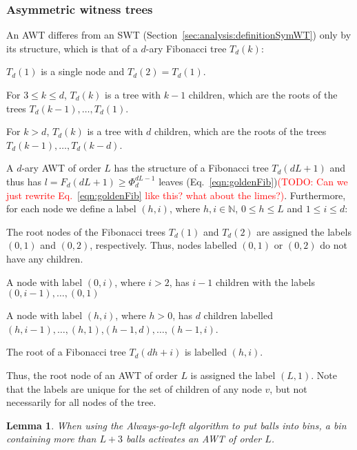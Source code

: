 \documentclass[a4paper,12pt]{article}
\newcommand\todo[1]{\textcolor{red}{(TODO: #1)}}
\newtheorem{lemma}{Lemma}
\begin{document}
\subsubsection{Asymmetric witness trees}
\label{sec:analysis:definitionAsymWT}
An AWT differes from an SWT (Section~\ref{sec:analysis:definitionSymWT}) only by its structure, which is that of a $d$-ary Fibonacci tree $T_d\left(k \right)$:

\begin{compactitem}
\item $T_d(1)$ is a single node and  $T_d(2) = T_d(1)$.
\item For $3\leq k \leq d$, $T_d(k)$ is a tree with $k-1$ children, which are the roots of the trees $T_d(k-1),\ldots,T_d(1)$.
\item For $k>d$, $T_d(k)$ is a tree with $d$ children, which are the roots of the trees $T_d(k-1),\ldots,T_d(k-d)$.
\end{compactitem}
A $d$-ary AWT of order $L$ has the structure of a Fibonacci tree $T_d(d  L+1)$ and thus has $l=F_d(d L + 1) \geq \Phi_d^{d L-1}$ leaves (Eq.~\ref{eqn:goldenFib})\todo{Can we just rewrite Eq.~\ref{eqn:goldenFib} like this? what about the limes?}. 
Furthermore, for each node we define a label $(h, i)$, where $h, i \in \mathbb{N}$, $0 \leq h \leq L$ and  $1\leq i \leq d$:
\begin{compactitem}
\item The root nodes of the Fibonacci trees $T_d(1)$ and $T_d(2)$ are assigned the labels $(0,1)$ and $(0,2)$, respectively. Thus, nodes labelled $(0,1)$ or $(0,2)$ do not have any children.
\item A node with label $(0, i)$, where $i>2$, has $i-1$ children with the labels $(0,i-1),\dots,(0,1)$
\item A node with label $(h,i)$, where $h>0$, has $d$ children labelled $(h,i-1),\dots,(h,1)$,$(h-1,d),\dots,(h-1, i)$.
\item The root of a Fibonacci tree $T_d(d h+i)$ is labelled $(h, i)$. 
\end{compactitem}
Thus, the root node of an AWT of order $L$ is assigned the label $(L, 1)$. Note that the labels are unique for the set of children of any node $v$, but not necessarily for all nodes of the tree. 
\begin{lemma}
When using the Always-go-left algorithm to put balls into bins, a bin containing more than $L+3$ balls activates an AWT of order $L$.
\end{lemma}
\end{document}
